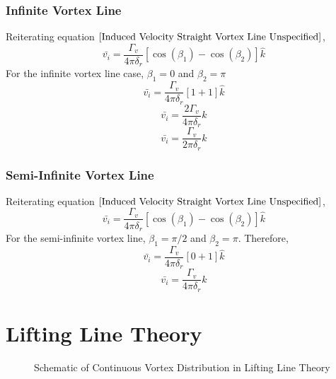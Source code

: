 \documentclass[a4paper, 12pt]{report}
\begin{document}
\begin{center}
\subsubsection{Infinite Vortex Line}
\begin{comment}
\end{comment}
Reiterating equation $\ref{Induced Velocity Straight Vortex Line Unspecified}$,
$$\bar{v_{i}} = \frac{\Gamma_{v}}{4\pi\delta_{r}}\left[\cos(\beta_{1}) - \cos(\beta_{2})\right]\hat{k}$$
For the infinite vortex line case, $\beta_{1} = 0$ and $\beta_{2} = \pi$
$$\bar{v_{i}} = \frac{\Gamma_{v}}{4\pi\delta_{r}}\left[1+1\right]\hat{k}$$
$$\bar{v_{i}} = \frac{2\Gamma_{v}}{4\pi\delta_{r}}\hat{k}$$
\begin{equation}
\bar{v_{i}} = \frac{\Gamma_{v}}{2\pi\delta_{r}}\hat{k}
\label{Induced Velocity Infinite Vortex Line Result}
\end{equation}


\subsubsection{Semi-Infinite Vortex Line}
\begin{comment}
\end{comment}
Reiterating equation $\ref{Induced Velocity Straight Vortex Line Unspecified}$,
$$\bar{v_{i}} = \frac{\Gamma_{v}}{4\pi\delta_{r}}\left[\cos(\beta_{1}) - \cos(\beta_{2})\right]\hat{k}$$
For the semi-infinite vortex line, $\beta_{1} = \pi/2$ and $\beta_{2} = \pi$. Therefore,
$$\bar{v_{i}} = \frac{\Gamma_{v}}{4\pi\delta_{r}}\left[0 + 1\right]\hat{k}$$
\begin{equation}
\bar{v_{i}} = \frac{\Gamma_{v}}{4\pi\delta_{r}}\hat{k}
\label{Induced Velocity Semi-Infinite Vortex Line Result}
\end{equation}

\section{Lifting Line Theory}
\begin{comment}
\end{comment}
\begin{figure}[H]\centering
\caption{Schematic of Continuous Vortex Distribution in Lifting Line Theory}
\label{Lifting Line Vortex Distribution Schematic}
\end{figure}


\end{center}
\end{document}
